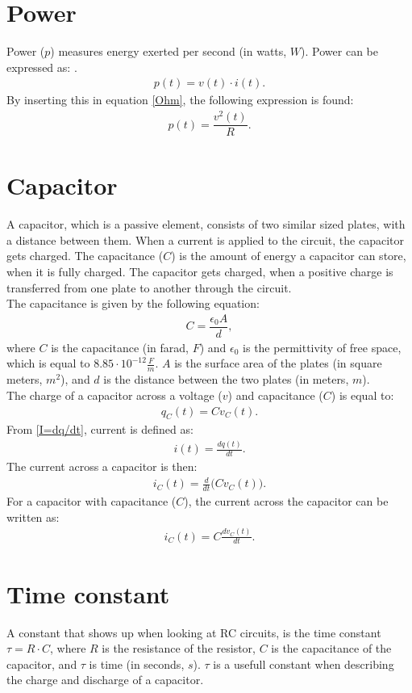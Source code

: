 \section{Power} 
Power ($p$) measures energy exerted per second (in watts, $W$). Power can be expressed as: \cite[p. 22]{bcircuit5}.
\begin{align} 
\label{power}
p(t)=v(t)\cdot i(t).
\end{align}
By inserting this in equation \eqref{Ohm}, the following expression is found:
\begin{align}
p(t)=\dfrac{v^2(t)}{R}. \label{resistor:power}
\end{align}

\section{Capacitor}
A capacitor, which is a passive element, consists of two similar sized plates, with a distance between them. When a current is applied to the circuit, the capacitor gets charged. The capacitance ($C$) is the amount of energy a capacitor can store, when it is fully charged. The capacitor gets charged, when a positive charge is transferred from one plate to another through the circuit.
\\
The capacitance is given by the following equation:
\begin{align*}
C=\dfrac{\epsilon_{0}A}{d},
\end{align*}
where $C$ is the capacitance (in farad, $F$) and $\epsilon_{0}$ is the permittivity of free space, which is equal to $8.85 \cdot 10^{-12}                                                 \frac{F}{m}$. $A$ is the surface area of the plates (in square meters, $m^{2}$), and $d$ is the distance between the two plates (in meters, $m$).
\\
The charge of a capacitor across a voltage ($v$) and capacitance ($C$) is equal to: \cite[p.~253]{bcircuit5}
\begin{align}
\label{QCV}
q_C(t) = Cv_C(t).	
\end{align}
From \eqref{I=dq/dt}, current is defined as:
\begin{align*}
	i(t) = \frac{dq(t)}{dt}.
\end{align*}
The current across a capacitor is then:
\begin{align*}
	i_C(t) = \frac{d}{dt}\big(Cv_C(t)\big).
\end{align*}
For a capacitor with capacitance ($C$), the current across the capacitor can be written as:
\begin{align}
	i_C(t) = C\frac{dv_C(t)}{dt}.\label{iC}
\end{align}
\section{Time constant}
A constant that shows up when looking at RC circuits, is the time constant $\tau = R \cdot C$, where $R$ is the resistance of the resistor, $C$ is the capacitance of the capacitor, and $\tau$ is time (in seconds, $s$). $\tau$ is a usefull constant when describing the charge and discharge of a capacitor. 
